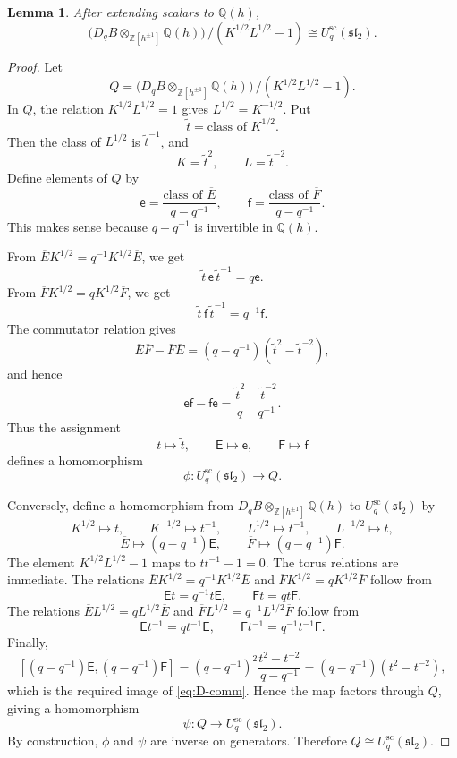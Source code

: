 \documentclass[12pt]{article}
\theoremstyle{plain}
\newtheorem{lemma}[theorem]{Lemma}
\theoremstyle{definition}
\numberwithin{equation}{section}
\newcommand{\Ring}{\mathbb{Z}[h^{\pm 1}]}
\newcommand{\Field}{\mathbb{Q}(h)}
\newcommand{\DqB}{D_qB}
\newcommand{\Khalf}{K^{1/2}}
\newcommand{\Kmh}{K^{-1/2}}
\newcommand{\Lhalf}{L^{1/2}}
\newcommand{\Lmh}{L^{-1/2}}
\newcommand{\Ebar}{\overline{E}}
\newcommand{\Fbar}{\overline{F}}
\newcommand{\Uqsc}{U_q^{\mathrm{sc}}(\mathfrak{sl}_2)}
\begin{document}
\begin{lemma}\label{lem:quotient-is-Uqsc}
After extending scalars to \(\Field\),
\[
\bigl(\DqB\otimes_{\Ring}\Field\bigr)\,/
(\Khalf\Lhalf-1)
\cong
\Uqsc.
\]
\end{lemma}

\begin{proof}
Let
\[
Q=\bigl(\DqB\otimes_{\Ring}\Field\bigr)\,/
(\Khalf\Lhalf-1).
\]
In \(Q\), the relation \(\Khalf\Lhalf=1\) gives \(\Lhalf=\Kmh\).  Put
\[
\tilde t=\text{class of }\Khalf.
\]
Then the class of \(\Lhalf\) is \(\tilde t^{-1}\), and
\[
K=\tilde t^2,
\qquad
L=\tilde t^{-2}.
\]
Define elements of \(Q\) by
\[
\mathsf e=\frac{\text{class of }\Ebar}{q-q^{-1}},
\qquad
\mathsf f=\frac{\text{class of }\Fbar}{q-q^{-1}}.
\]
This makes sense because \(q-q^{-1}\) is invertible in \(\Field\).

From \(\Ebar\Khalf=q^{-1}\Khalf\Ebar\), we get
\[
\tilde t\,\mathsf e\,\tilde t^{-1}=q\mathsf e.
\]
From \(\Fbar\Khalf=q\Khalf\Fbar\), we get
\[
\tilde t\,\mathsf f\,\tilde t^{-1}=q^{-1}\mathsf f.
\]
The commutator relation gives
\[
\Ebar\Fbar-\Fbar\Ebar
=
(q-q^{-1})(\tilde t^2-\tilde t^{-2}),
\]
and hence
\[
\mathsf e\mathsf f-\mathsf f\mathsf e
=
\frac{\tilde t^2-\tilde t^{-2}}{q-q^{-1}}.
\]
Thus the assignment
\[
t\mapsto \tilde t,
\qquad
\mathsf E\mapsto \mathsf e,
\qquad
\mathsf F\mapsto \mathsf f
\]
defines a homomorphism
\[
\phi:\Uqsc\longrightarrow Q.
\]

Conversely, define a homomorphism from \(\DqB\otimes_{\Ring}\Field\) to \(\Uqsc\) by
\[
\Khalf\mapsto t,
\qquad
\Kmh\mapsto t^{-1},
\qquad
\Lhalf\mapsto t^{-1},
\qquad
\Lmh\mapsto t,
\]
\[
\Ebar\mapsto (q-q^{-1})\mathsf E,
\qquad
\Fbar\mapsto (q-q^{-1})\mathsf F.
\]
The element \(\Khalf\Lhalf-1\) maps to \(tt^{-1}-1=0\).  The torus relations are immediate.  The relations \(\Ebar\Khalf=q^{-1}\Khalf\Ebar\) and \(\Fbar\Khalf=q\Khalf\Fbar\) follow from
\[
\mathsf E t=q^{-1}t\mathsf E,
\qquad
\mathsf F t=q t\mathsf F.
\]
The relations \(\Ebar\Lhalf=q\Lhalf\Ebar\) and \(\Fbar\Lhalf=q^{-1}\Lhalf\Fbar\) follow from
\[
\mathsf E t^{-1}=q t^{-1}\mathsf E,
\qquad
\mathsf F t^{-1}=q^{-1}t^{-1}\mathsf F.
\]
Finally,
\[
[(q-q^{-1})\mathsf E,(q-q^{-1})\mathsf F]
=
(q-q^{-1})^2\frac{t^2-t^{-2}}{q-q^{-1}}
=
(q-q^{-1})(t^2-t^{-2}),
\]
which is the required image of \eqref{eq:D-comm}.  Hence the map factors through \(Q\), giving a homomorphism
\[
\psi:Q\longrightarrow \Uqsc.
\]
By construction, \(\phi\) and \(\psi\) are inverse on generators.  Therefore \(Q\cong \Uqsc\).
\end{proof}
\end{document}
